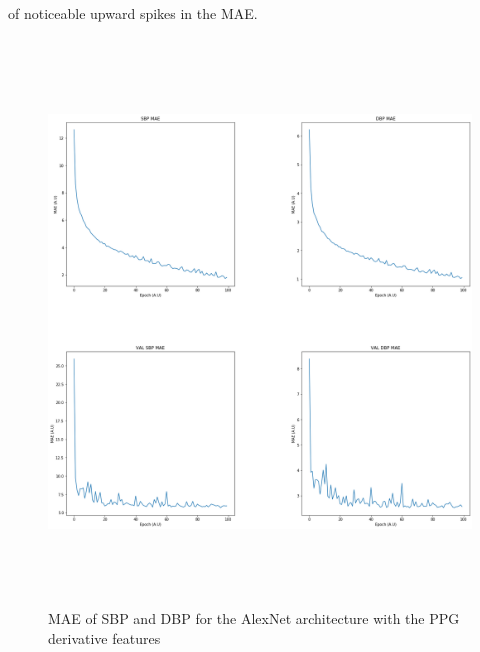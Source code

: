 of noticeable upward spikes in the MAE.
\begin{figure}[H]
    \centering
    \includegraphics[width=15cm,height=15cm,keepaspectratio]{Results/resnetDeriv.png}
    \caption{MAE of SBP and DBP for the AlexNet architecture with the PPG derivative features}
    \label{alexnetDerivResults}
\end{figure}

